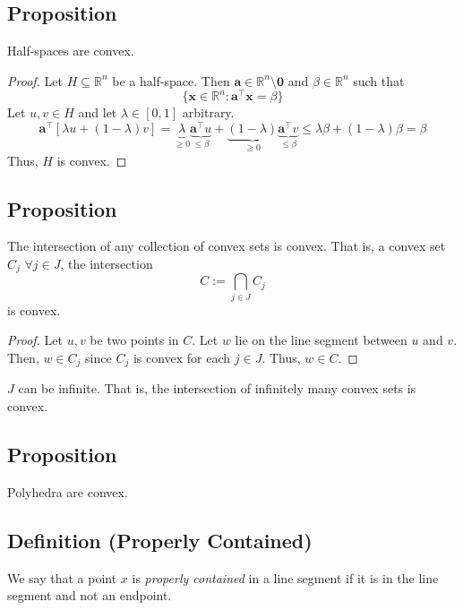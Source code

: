\begin{thmbox}
    \subsection{Proposition}
    Half-spaces are convex.
\end{thmbox}
\begin{proof}
    Let $ H\subseteq\mathbb{R}^n $ be a half-space. Then $ \bm{a} \in \mathbb{R}
    ^n\setminus{\bm{0}} $ and $ \beta\in\mathbb{R}^n $ such that
    \[ \{\bm{x}\in\mathbb{R}^n:\bm{a} ^\top \bm{x}=\beta\} \]
    Let $ u,v\in H $ and let $ \lambda\in[0,1] $ arbitrary.
    \[ \bm{a} ^\top[\lambda u+(1-\lambda)v]=
    \underbrace{\lambda}_{\ge 0}\underbrace{\bm{a} ^\top u}_{\le \beta}+
    \underbrace{(1-\lambda)}_{\ge 0}\underbrace{\bm{a} ^\top v}_{\le \beta}
    \le \lambda \beta + (1-\lambda)\beta=\beta \]
    Thus, $ H $ is convex.
\end{proof}

\begin{thmbox}
    \subsection{Proposition}
    The intersection of any collection of convex sets is convex. 
    That is, a convex set $ C_j $ $ \forall j\in J $, the intersection
    \[ C:=\bigcap_{j\in J} C_j \]
    is convex.
\end{thmbox}

\begin{proof}
    Let $ u,v $ be two points in $ C $. Let $ w $ lie on the line
    segment between $ u $ and $ v $. Then, $ w\in C_j $ since $ C_j $ is convex
    for each $ j\in J $. Thus, $ w\in C $.
\end{proof}

\begin{remark}
    $ J $ can be infinite. That is, the intersection of infinitely many convex sets
    is convex.
\end{remark}

\begin{thmbox}
    \subsection{Proposition}
    Polyhedra are convex.
\end{thmbox}

\begin{defbox}
    \subsection{Definition (Properly Contained)}
    We say that a point $x$ is \emph{properly contained} in a line segment if it is in the line segment and not an endpoint.
\end{defbox}

